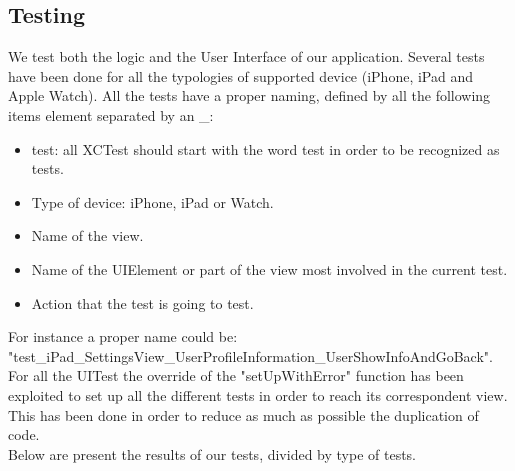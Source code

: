 \subsection{Testing}
We test both the logic and the User Interface of our application. Several tests have been done for all the typologies of supported device (iPhone, iPad and Apple Watch).
All the tests have a proper naming, defined by all the following items element separated by an \_:
\begin{itemize}
    \item test: all XCTest should start with the word test in order to be recognized as tests.
    \item Type of device: iPhone, iPad or Watch.
    \item Name of the view.
    \item Name of the UIElement or part of the view most involved in the current test.
    \item Action that the test is going to test.
\end{itemize}
For instance a proper name could be:\\ "test\_iPad\_SettingsView\_UserProfileInformation\_UserShowInfoAndGoBack".
For all the UITest the override of the "setUpWithError" function has been exploited to set up all the different tests in order to reach its correspondent view. This has been done in order to reduce as much as possible the duplication of code.
\\
Below are present the results of our tests, divided by type of tests.

\newpage
